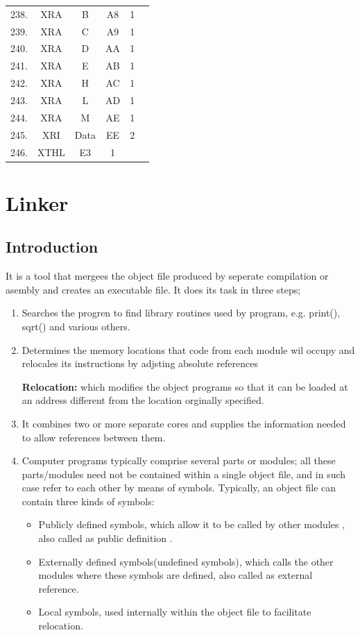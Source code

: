 \documentclass{scrreprt}
\begin{document}
\begin{longtable}{|c|c|c|c|c|c|}
238. & XRA  & B            & A8   & 1  &   \\
239. & XRA  & C            & A9   & 1  &   \\
240. & XRA  & D            & AA   & 1  &   \\
241. & XRA  & E            & AB   & 1  &   \\
242. & XRA  & H            & AC   & 1  &   \\
243. & XRA  & L            & AD   & 1  &   \\
244. & XRA  & M            & AE   & 1  &   \\
245. & XRI  & Data         & EE   & 2  &   \\
246. & XTHL & E3           & 1    &    &  
\end{longtable}

\chapter{Linker}
\section{Introduction}
It is a tool that mergees the object file produced by seperate compilation or asembly and creates an executable file.
It does its task in three steps;
\begin{enumerate}
\item Searches the progren to find library routines used by
program, e.g. print(), sqrt() and various others.

\item Determines the memory locations that code from each
module wil occupy and relocales its instructions by
adjsting absolute references

\textbf{Relocation:} which modifies the object programs so that it can be loaded at an address different from the location orginally specified.

\item It combines two or more separate cores and supplies the
information needed to allow references between them.

\item Computer programs typically comprise several parts or
modules; all these parts/modules need not be contained within
a single object file, and in such case refer to each other by
means of symbols. Typically, an object file can contain three
kinds of symbols:
\begin{itemize}
\item Publicly defined symbols, which allow it to be called by other
modules , also called as public definition .
\item Externally defined symbols(undefined symbols), which calls
the other modules where these symbols are defined, also
called as external reference.
\item Local symbols, used internally within the object file to facilitate
relocation.  
\end{itemize}
\end{enumerate}
\end{document}
